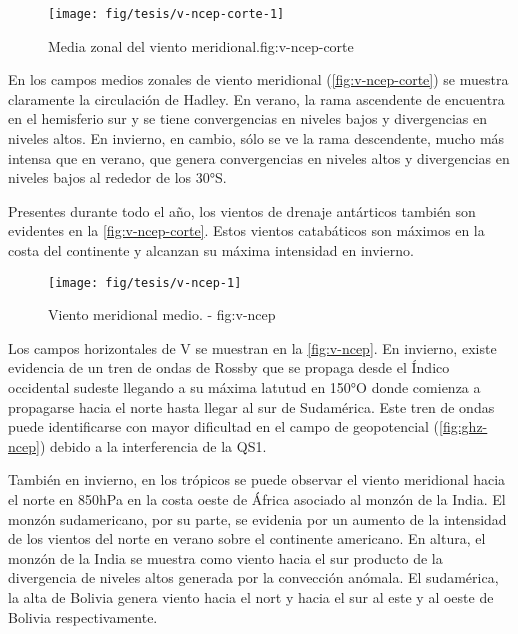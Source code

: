 \documentclass[spanish,a4paper]{book}
\begin{document}
\begin{figure}

{\centering \texttt{[image: fig/tesis/v-ncep-corte-1]} 

}

\caption{Media zonal del viento meridional.{fig:v-ncep-corte}}\label{fig:v-ncep-corte}
\end{figure}

En los campos medios zonales de viento meridional
(\autoref{fig:v-ncep-corte}) se muestra claramente la circulación de
Hadley. En verano, la rama ascendente de encuentra en el hemisferio sur
y se tiene convergencias en niveles bajos y divergencias en niveles
altos. En invierno, en cambio, sólo se ve la rama descendente, mucho más
intensa que en verano, que genera convergencias en niveles altos y
divergencias en niveles bajos al rededor de los 30°S.

Presentes durante todo el año, los vientos de drenaje antárticos también
son evidentes en la \autoref{fig:v-ncep-corte}. Estos vientos
catabáticos son máximos en la costa del continente y alcanzan su máxima
intensidad en invierno.

\begin{figure}

{\centering \texttt{[image: fig/tesis/v-ncep-1]} 

}

\caption{Viento meridional medio. - fig:v-ncep}\label{fig:v-ncep}
\end{figure}

Los campos horizontales de V se muestran en la \autoref{fig:v-ncep}. En
invierno, existe evidencia de un tren de ondas de Rossby que se propaga
desde el Índico occidental sudeste llegando a su máxima latutud en 150°O
donde comienza a propagarse hacia el norte hasta llegar al sur de
Sudamérica. Este tren de ondas puede identificarse con mayor dificultad
en el campo de geopotencial (\autoref{fig:ghz-ncep}) debido a la
interferencia de la QS1.

También en invierno, en los trópicos se puede observar el viento
meridional hacia el norte en 850hPa en la costa oeste de África asociado
al monzón de la India. El monzón sudamericano, por su parte, se evidenia
por un aumento de la intensidad de los vientos del norte en verano sobre
el continente americano. En altura, el monzón de la India se muestra
como viento hacia el sur producto de la divergencia de niveles altos
generada por la convección anómala. El sudamérica, la alta de Bolivia
genera viento hacia el nort y hacia el sur al este y al oeste de Bolivia
respectivamente.
\end{document}
